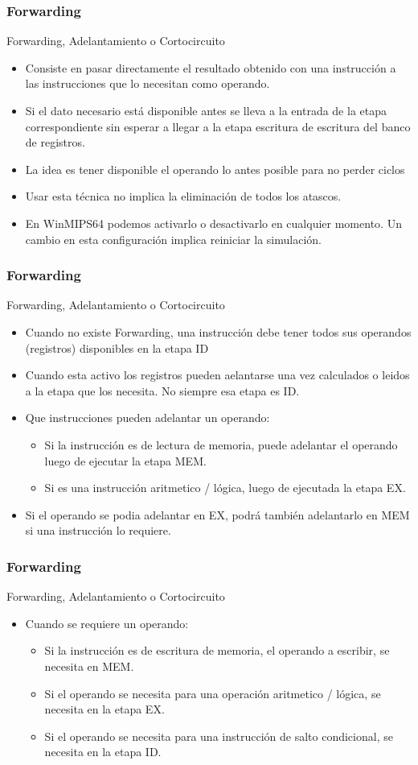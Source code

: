 \documentclass{beamer}
\begin{document}
\begin{frame}[fragile]
\frametitle{Forwarding}
Forwarding, Adelantamiento o Cortocircuito
\begin{itemize}
\item Consiste en pasar directamente el resultado obtenido con una instrucción a las instrucciones que lo necesitan como operando.
\item Si el dato necesario está disponible antes se lleva a la entrada de la etapa correspondiente sin esperar a llegar a la etapa escritura de escritura del banco de registros.
\item La idea es tener disponible el operando lo antes posible para no perder ciclos
\item Usar esta técnica no implica la eliminación de todos los atascos.
\item En WinMIPS64 podemos activarlo o desactivarlo en cualquier momento. Un cambio en esta configuración implica reiniciar la simulación.
\end{itemize}
\end{frame}


\begin{frame}[fragile]
\frametitle{Forwarding}
Forwarding, Adelantamiento o Cortocircuito
\begin{itemize}
\item Cuando no existe Forwarding, una instrucción debe tener todos sus operandos (registros) disponibles en la etapa ID
\item Cuando esta activo los registros pueden aelantarse una vez calculados o leidos a la etapa que los necesita. No siempre esa etapa es ID.
\item Que instrucciones pueden adelantar un operando:
\begin{itemize}
\item Si la instrucción es de lectura de memoria, puede adelantar el operando luego de ejecutar la etapa MEM.
\item Si es una instrucción aritmetico / lógica, luego de ejecutada la etapa EX.
\end{itemize}
\item Si el operando se podia adelantar en EX, podrá también adelantarlo en MEM si una instrucción lo requiere.
\end{itemize}
\end{frame}

\begin{frame}[fragile]
\frametitle{Forwarding}
Forwarding, Adelantamiento o Cortocircuito
\begin{itemize}
\item Cuando se requiere un operando:
\begin{itemize}
\item Si la instrucción es de escritura de memoria, el operando a escribir, se necesita en MEM.
\item Si el operando se necesita para una operación aritmetico / lógica, se necesita en la etapa EX.
\item Si el operando se necesita para una instrucción de salto condicional, se necesita en la etapa ID.
\end{itemize}
\end{itemize}
\end{frame}
\end{document}
